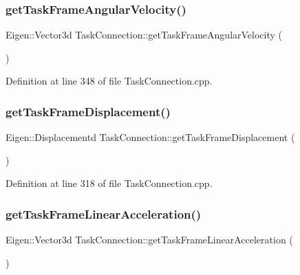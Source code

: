 \subsubsection{\texorpdfstring{get\+Task\+Frame\+Angular\+Velocity()}{getTaskFrameAngularVelocity()}}
{\footnotesize\ttfamily Eigen\+::\+Vector3d Task\+Connection\+::get\+Task\+Frame\+Angular\+Velocity (\begin{DoxyParamCaption}{ }\end{DoxyParamCaption})}



Definition at line 348 of file Task\+Connection.\+cpp.

\hypertarget{classocra__recipes_1_1TaskConnection_a4595bb517cd965bc9f08f609e3e15e78}{}\label{classocra__recipes_1_1TaskConnection_a4595bb517cd965bc9f08f609e3e15e78} 
\subsubsection{\texorpdfstring{get\+Task\+Frame\+Displacement()}{getTaskFrameDisplacement()}}
{\footnotesize\ttfamily Eigen\+::\+Displacementd Task\+Connection\+::get\+Task\+Frame\+Displacement (\begin{DoxyParamCaption}{ }\end{DoxyParamCaption})}



Definition at line 318 of file Task\+Connection.\+cpp.

\hypertarget{classocra__recipes_1_1TaskConnection_a4c489ec411ea7cb026213ac53111431d}{}\label{classocra__recipes_1_1TaskConnection_a4c489ec411ea7cb026213ac53111431d} 
\subsubsection{\texorpdfstring{get\+Task\+Frame\+Linear\+Acceleration()}{getTaskFrameLinearAcceleration()}}
{\footnotesize\ttfamily Eigen\+::\+Vector3d Task\+Connection\+::get\+Task\+Frame\+Linear\+Acceleration (\begin{DoxyParamCaption}{ }\end{DoxyParamCaption})}



